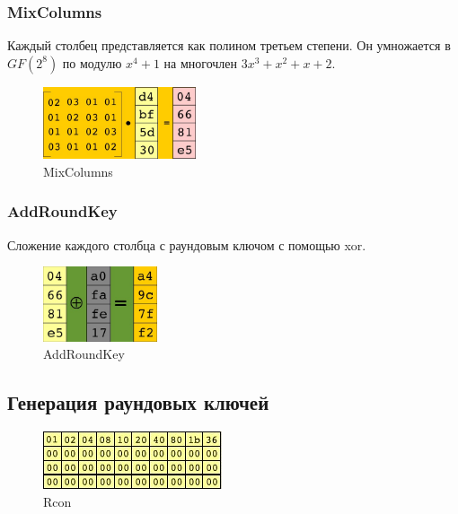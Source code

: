 \documentclass[a4paper, 14pt]{extarticle}
\begin{document}
\subsubsection{MixColumns}
Каждый столбец представляется как полином третьем степени. Он умножается в $GF(2^8)$ по модулю $x^4 + 1$ на многочлен $3x^3 + x^2 + x + 2$.
\begin{figure}[h]
    \centering
    \includegraphics[width=0.4\textwidth]{img/S008.jpg}
    \caption{MixColumns}
\end{figure}

\FloatBarrier{}
\subsubsection{AddRoundKey}
Сложение каждого столбца с раундовым ключом с помощью xor.

\begin{figure}[h]
    \centering
    \includegraphics[width=0.3\textwidth]{img/S009.jpg}
    \caption{AddRoundKey}
\end{figure}

\FloatBarrier{}
\subsection{Генерация раундовых ключей}
\begin{figure}[h]
    \centering
    \includegraphics{img/S010.jpg}
    \caption{Rcon}
\end{figure}
\end{document}
